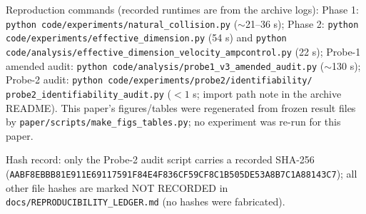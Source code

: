 Reproduction commands (recorded runtimes are from the archive logs):
Phase 1: \texttt{python code/\allowbreak{}experiments/\allowbreak{}natural\_\allowbreak{}\allowbreak{}collision.py} ($\sim$21--36
s); Phase 2: \texttt{python code/\allowbreak{}experiments/\allowbreak{}effective\_\allowbreak{}\allowbreak{}dimension.py} (54 s)
and \texttt{python code/\allowbreak{}analysis/\allowbreak{}effective\_\allowbreak{}\allowbreak{}dimension\_\allowbreak{}\allowbreak{}velocity\_\allowbreak{}\allowbreak{}ampcontrol.py}
(22 s); Probe-1 amended audit:
\texttt{python code/\allowbreak{}analysis/\allowbreak{}probe1\_\allowbreak{}\allowbreak{}v3\_\allowbreak{}\allowbreak{}amended\_\allowbreak{}\allowbreak{}audit.py} ($\sim$130 s);
Probe-2 audit: \texttt{python code/\allowbreak{}experiments/\allowbreak{}probe2/\allowbreak{}identifiability/\allowbreak{}
probe2\_\allowbreak{}\allowbreak{}identifiability\_\allowbreak{}\allowbreak{}audit.py} ($< 1$ s; import path note in the
archive README).  This paper's figures/\allowbreak{}tables were regenerated from
frozen result files by \texttt{paper/\allowbreak{}scripts/\allowbreak{}make\_\allowbreak{}\allowbreak{}figs\_\allowbreak{}\allowbreak{}tables.py}; no
experiment was re-run for this paper.

Hash record: only the Probe-2 audit script carries a recorded SHA-256
(\texttt{AABF8EBBB81E911E\allowbreak{}69117591F84E4F83\allowbreak{}6CF59CF8C1B505DE\allowbreak{}53A8B7C1A88143C7});
all other file hashes are marked NOT RECORDED in
\texttt{docs/\allowbreak{}REPRODUCIBILITY\_\allowbreak{}\allowbreak{}LEDGER.md} (no hashes were fabricated).

